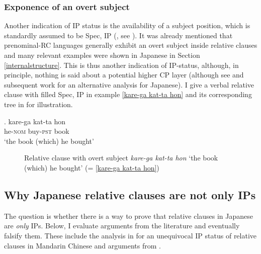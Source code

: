 \subsubsection{Exponence of an overt subject}

Another indication of IP status is the availability of a subject position, which is standardly assumed to be Spec, IP (\citealt{chomsky:1986:barriers, koopman:1991:the}, see \citealt{mccloskey:1997:subject}). It was already mentioned that prenominal-RC languages generally exhibit an overt subject inside relative clauses and many relevant examples were shown in Japanese in Section \ref{internalstructure}. This is thus another indication of IP-status, although, in principle, nothing is said about a potential higher CP layer (although see \citealt{fukui:1986:theory} and subsequent work for an alternative analysis for Japanese). I give a verbal relative clause with filled Spec, IP in example \ref{kare-ga kat-ta hon} and its corresponding tree in  for illustration.

\exg. kare-ga kat-ta hon\\
he-\textsc{nom} buy-\textsc{pst} book\\
`the book (which) he bought' \label{kare-ga kat-ta hon}

\begin{figure}
\centering
{}
\caption{Relative clause with overt subject \textit{kare-ga kat-ta hon} `the book (which) he bought' (= \ref{kare-ga kat-ta hon})}
\label{RC kare-ga kat-ta hon tree}
\end{figure}

\subsection{Why Japanese relative clauses are not only IPs}

The question is whether there is a way to prove that relative clauses in Japanese are \textit{only} IPs. Below, I evaluate arguments from the literature and eventually falsify them. These include the analysis in \citet{cinque:2020:relcl} for an unequivocal IP status of relative clauses in  Mandarin Chinese and arguments from \citet{murasugi:1991:noun}.

